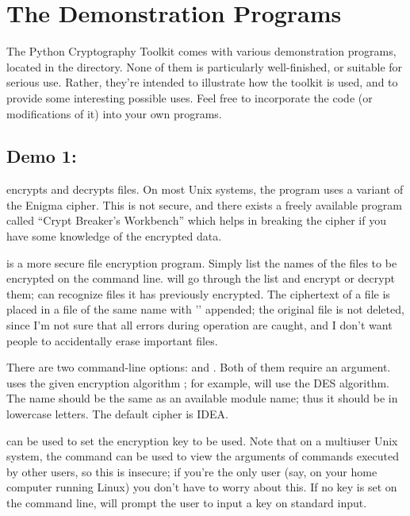 \documentclass{howto}
\begin{document}
\section{The Demonstration Programs}

The Python Cryptography Toolkit comes with various demonstration
programs, located in the  directory.  None of them is
particularly well-finished, or suitable for serious use.  Rather,
they're intended to illustrate how the toolkit is used, and to provide
some interesting possible uses.  Feel free to incorporate the code (or
modifications of it) into your own programs.

\subsection{Demo 1: }

 encrypts and decrypts files.  On most Unix systems, the
 program uses a variant of the Enigma cipher.  This is not
secure, and there exists a freely available program called ``Crypt
Breaker's Workbench'' which helps in breaking the cipher if you have
some knowledge of the encrypted data.

 is a more secure file encryption program.  Simply list
the names of the files to be encrypted on the command line.
 will go through the list and encrypt or decrypt them;
 can recognize files it has previously encrypted.  The
ciphertext of a file is placed in a file of the same name with
'' appended; the original file is not deleted, since I'm
not sure that all errors during operation are caught, and I don't want
people to accidentally erase important files.

There are two command-line options:  and .  Both of
them require an argument.   uses the
given encryption algorithm ; for example,
 will use the DES algorithm.  The name should be the same
as an available module name; thus it should be in lowercase letters.
The default cipher is IDEA.

 can be used to set the encryption key to be
used.  Note that on a multiuser Unix system, the  command can
be used to view the arguments of commands executed by other users, so
this is insecure; if you're the only user (say, on your home computer
running Linux) you don't have to worry about this.  If no key is set
on the command line,  will prompt the user to input a key
on standard input.
\end{document}

